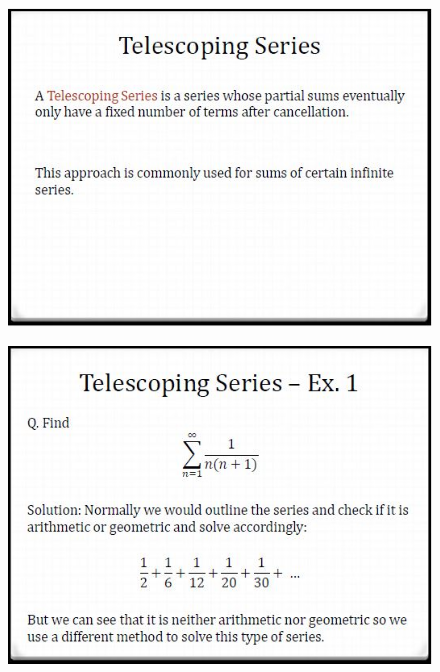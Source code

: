\documentclass{beamer}
\begin{document}
\begin{frame}
	\begin{figure}
		\centering
		\includegraphics[width=0.99\linewidth]{SeqSer22C}
	\end{figure}
	
\end{frame}	
\begin{frame}
	\begin{figure}
		\centering
		\includegraphics[width=0.99\linewidth]{SeqSer22D}
	\end{figure}
	
\end{frame}
\end{document}
